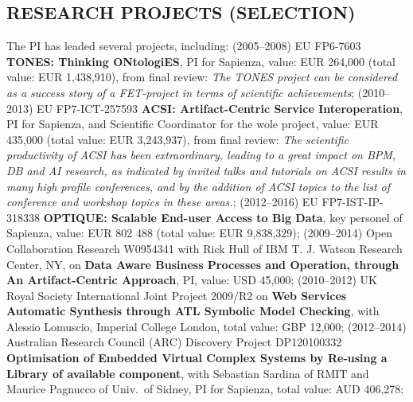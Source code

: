 

\vspace{-1ex}
\subsection*{RESEARCH PROJECTS (SELECTION)}
\vspace{-1ex}
The PI has leaded several projects, including:
%
(2005--2008) EU FP6-7603 \textbf{TONES: Thinking ONtologiES}, PI for Sapienza, value: EUR 264,000  (total value: EUR 1,438,910), from final review:  \emph{The TONES project can be considered as a success story of a FET-project in terms of scientific achievements};
(2010--2013) EU FP7-ICT-257593 \textbf{ACSI: Artifact-Centric Service
  Interoperation}, PI for Sapienza, and Scientific Coordinator for the wole project, value: EUR 435,000 (total value:
EUR 3,243,937), from final review: \emph{The scientific productivity
of ACSI has been extraordinary, leading to a great impact on BPM, DB
and AI research, as indicated by invited talks and tutorials on ACSI
results in many high profile conferences, and by the addition of ACSI
topics to the list of conference and workshop topics in these
areas.};
(2012--2016) EU FP7-IST-IP-318338 \textbf{OPTIQUE: Scalable End-user Access to Big Data}, key personel of Sapienza, value: EUR 802 488  (total  value: EUR 9,838,329);
(2009--2014) Open Collaboration Research %
W0954341 with Rick Hull of IBM T. J. Watson Research Center, NY, on \textbf{Data Aware Business Processes and Operation, through An Artifact-Centric Approach}, PI, value: USD 45,000;
(2010--2012) UK Royal Society International Joint Project 2009/R2 on \textbf{Web Services Automatic Synthesis through ATL Symbolic Model Checking}, with Alessio Lomuscio, Imperial College London, total value: GBP 12,000;
(2012--2014) Australian Research Council  (ARC) %
Discovery Project DP120100332 \textbf{Optimisation of Embedded Virtual Complex Systems by Re-using a Library of available component}, with Sebastian Sardina of RMIT and Maurice Pagnucco of Univ.\ of Sidney, PI for Sapienza, total  value: AUD 406,278;
